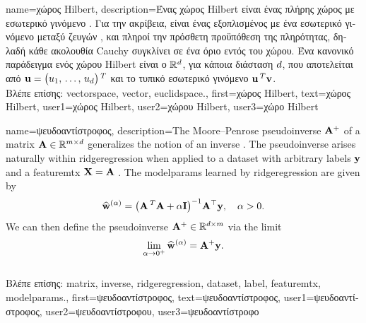 {name={\foreignlanguage{greek}{χώρος} Hilbert},
	description={\foreignlanguage{greek}{Ένας χώρος} Hilbert \foreignlanguage{greek}{είναι ένας 
		πλήρης χώρος με εσωτερικό γινόμενο} \cite{introhilbertbook}. \foreignlanguage{greek}{Για την ακρίβεια, είναι ένας} 
		\foreignlanguage{greek}{εξοπλισμένος με ένα εσωτερικό γινόμενο μεταξύ ζευγών} , \foreignlanguage{greek}{και πληροί 
		την πρόσθετη προϋπόθεση της πληρότητας, δηλαδή κάθε ακολουθία} Cauchy  \foreignlanguage{greek}{συγκλίνει σε 
		ένα όριο εντός του χώρου. Ένα κανονικό παράδειγμα ενός χώρου} Hilbert \foreignlanguage{greek}{είναι ο}  
		$\mathbb{R}^{d}$, \foreignlanguage{greek}{για κάποια διάσταση $d$, που αποτελείται από}  
		${\bf u} = \big(u_1, \,\ldots, \,u_{d}\big)\,^{T}$ \foreignlanguage{greek}{και το τυπικό εσωτερικό γινόμενο} ${\bf u}\,^{T} {\bf v}$.\\
		\foreignlanguage{greek}{Βλέπε επίσης:} \gls{vectorspace}, \gls{vector}, \gls{euclidspace}.},
	first={\foreignlanguage{greek}{χώρος} Hilbert},
	text={\foreignlanguage{greek}{χώρος} Hilbert},
	user1={\foreignlanguage{greek}{χώρος} Hilbert}, %
	user2={\foreignlanguage{greek}{χώρου} Hilbert}, %
	user3={\foreignlanguage{greek}{χώρο} Hilbert} %
}

{name={\foreignlanguage{greek}{ψευδοαντίστροφος}},
 	description={The Moore–Penrose pseudoinverse ${\bf A}^{+}$ 
 		of a \gls{matrix} ${\bf A} \in \mathbb{R}^{m \times d}$ generalizes the 
		notion of an \gls{inverse} \cite{GolubVanLoanBook}. The pseudoinverse arises naturally 
 		within \gls{ridgeregression} when applied to a \gls{dataset} with arbitrary \gls{label}s ${\bf y}$ 
 		and a \gls{featuremtx} ${\bf X} = {\bf A}$ \cite[Ch.\ 3]{hastie01statisticallearning}. The \gls{modelparams} 
 		learned by \gls{ridgeregression} are given by
  		\[
  		\widehat{{\bf w}}^{(\alpha)}  = \big({\bf A}\,^{T} {\bf A} + \alpha \mathbf{I} \big)^{-1} {\bf A}^\top {\bf y}, \quad \alpha > 0.
  		\]
  		We can then define the pseudoinverse ${\bf A}^+ \in \mathbb{R}^{d \times m}$ via 
  		the limit \cite[Ch. 3]{benisrael2003generalized}
  		\[
  		\lim_{\alpha \to 0^+} \widehat{{\bf w}}^{(\alpha)} = {\bf A}^+ {\bf y}.
  		\] \\
		\foreignlanguage{greek}{Βλέπε επίσης:} \gls{matrix}, \gls{inverse}, \gls{ridgeregression}, \gls{dataset}, \gls{label}, 
		\gls{featuremtx}, \gls{modelparams}.},
 	first={\foreignlanguage{greek}{ψευδοαντίστροφος}},
 	text={\foreignlanguage{greek}{ψευδοαντίστροφος}},
	user1={\foreignlanguage{greek}{ψευδοαντίστροφος}}, %
    	user2={\foreignlanguage{greek}{ψευδοαντίστροφου}}, %
	user3={\foreignlanguage{greek}{ψευδοαντίστροφο}} %
 }

